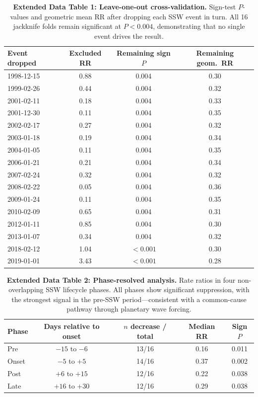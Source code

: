 \documentclass[11pt,letterpaper]{article}
\begin{document}
\begin{table}[!ht]
\centering
\caption{\textbf{Extended Data Table 1: Leave-one-out cross-validation.}
Sign-test $P$-values and geometric mean RR after dropping each SSW event in turn. All 16 jackknife folds remain significant at $P < 0.004$, demonstrating that no single event drives the result.}
\label{tab:loo}
\small
\begin{tabular}{lccc}
\toprule
Event dropped & Excluded RR & Remaining sign $P$ & Remaining geom.\ RR \\
\midrule
1998-12-15 & 0.88 & 0.004 & 0.30 \\
1999-02-26 & 0.44 & 0.004 & 0.32 \\
2001-02-11 & 0.18 & 0.004 & 0.33 \\
2001-12-30 & 0.11 & 0.004 & 0.35 \\
2002-02-17 & 0.27 & 0.004 & 0.32 \\
2003-01-18 & 0.19 & 0.004 & 0.34 \\
2004-01-05 & 0.11 & 0.004 & 0.35 \\
2006-01-21 & 0.21 & 0.004 & 0.34 \\
2007-02-24 & 0.32 & 0.004 & 0.32 \\
2008-02-22 & 0.05 & 0.004 & 0.36 \\
2009-01-24 & 0.11 & 0.004 & 0.35 \\
2010-02-09 & 0.65 & 0.004 & 0.31 \\
2012-01-11 & 0.85 & 0.004 & 0.30 \\
2013-01-07 & 0.34 & 0.004 & 0.32 \\
2018-02-12 & 1.04 & $< 0.001$ & 0.30 \\
2019-01-01 & 3.43 & $< 0.001$ & 0.28 \\
\bottomrule
\end{tabular}
\end{table}

\begin{table}[!ht]
\centering
\caption{\textbf{Extended Data Table 2: Phase-resolved analysis.}
Rate ratios in four non-overlapping SSW lifecycle phases. All phases show significant suppression, with the strongest signal in the pre-SSW period---consistent with a common-cause pathway through planetary wave forcing.}
\label{tab:phases}
\small
\begin{tabular}{lcccc}
\toprule
Phase & Days relative to onset & $n$ decrease / total & Median RR & Sign $P$ \\
\midrule
Pre & $-15$ to $-6$ & 13/16 & 0.16 & 0.011 \\
Onset & $-5$ to $+5$ & 14/16 & 0.37 & 0.002 \\
Post & $+6$ to $+15$ & 12/16 & 0.22 & 0.038 \\
Late & $+16$ to $+30$ & 12/16 & 0.29 & 0.038 \\
\bottomrule
\end{tabular}
\end{table}
\end{document}
